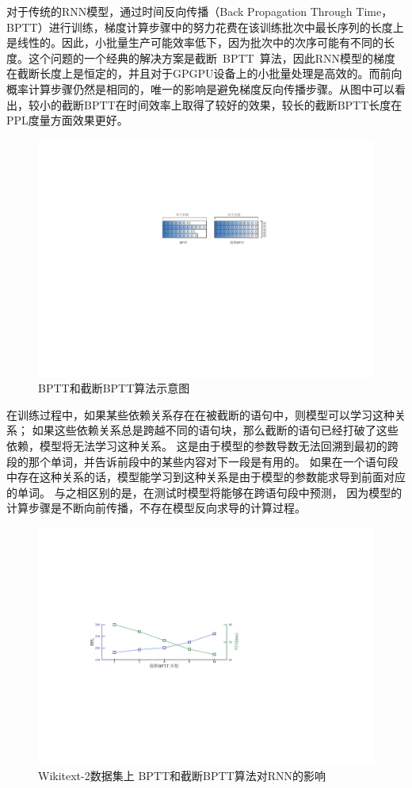 对于传统的RNN模型，通过时间反向传播（Back Propagation Through Time，BPTT）进行训练，梯度计算步骤中的努力花费在该训练批次中最长序列的长度上是线性的。因此，小批量生产可能效率低下，因为批次中的次序可能有不同的长度。这个问题的一个经典的解决方案是截断~BPTT~算法，因此RNN模型的梯度在截断长度上是恒定的，并且对于GPGPU设备上的小批量处理是高效的。而前向概率计算步骤仍然是相同的，唯一的影响是避免梯度反向传播步骤。从图中可以看出，较小的截断BPTT在时间效率上取得了较好的效果，较长的截断BPTT长度在PPL度量方面效果更好。
\begin{figure}[!ht]
  \centering
  \includegraphics[width=.8\columnwidth]{./figures/minibatch.pdf}
  \caption{BPTT和截断BPTT算法示意图}\label{fig:minibatch}
\end{figure}

在训练过程中，如果某些依赖关系存在在被截断的语句中，则模型可以学习这种关系； 如果这些依赖关系总是跨越不同的语句块，那么截断的语句已经打破了这些依赖，模型将无法学习这种关系。 这是由于模型的参数导数无法回溯到最初的跨段的那个单词，并告诉前段中的某些内容对下一段是有用的。
如果在一个语句段中存在这种关系的话，模型能学习到这种关系是由于模型的参数能求导到前面对应的单词。
与之相区别的是，在测试时模型将能够在跨语句段中预测， 因为模型的计算步骤是不断向前传播，不存在模型反向求导的计算过程。
\begin{figure}[!ht]
  \centering
  \includegraphics[width=.85\columnwidth]{./figures/tbptt.pdf}
  \caption{Wikitext-2数据集上 BPTT和截断BPTT算法对RNN的影响}\label{fig:tbptt}
\end{figure}

